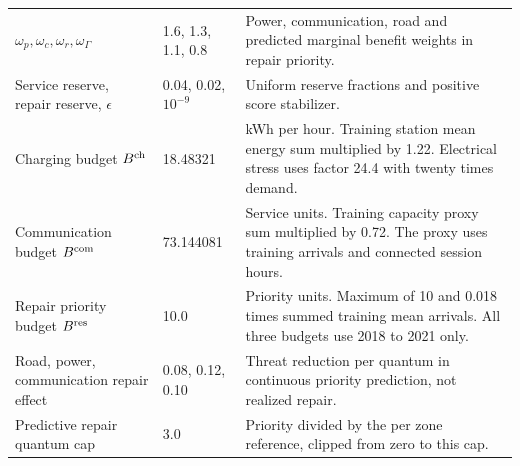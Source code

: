 \documentclass[journal]{IEEEtran}
\begin{document}
\begin{table}[p]
\begin{tabular}{@{}p{}p{}p{}@{}}
$\omega_p,\omega_c,\omega_r,\omega_\Gamma$ & 1.6, 1.3, 1.1, 0.8 & Power, communication, road and predicted marginal benefit weights in repair priority. \\
Service reserve, repair reserve, $\epsilon$ & 0.04, 0.02, $10^{-9}$ & Uniform reserve fractions and positive score stabilizer. \\
Charging budget $B^{\rm ch}$ & 18.48321 & kWh per hour. Training station mean energy sum multiplied by 1.22. Electrical stress uses factor 24.4 with twenty times demand. \\
Communication budget $B^{\rm com}$ & 73.144081 & Service units. Training capacity proxy sum multiplied by 0.72. The proxy uses training arrivals and connected session hours. \\
Repair priority budget $B^{\rm res}$ & 10.0 & Priority units. Maximum of 10 and 0.018 times summed training mean arrivals. All three budgets use 2018 to 2021 only. \\
Road, power, communication repair effect & 0.08, 0.12, 0.10 & Threat reduction per quantum in continuous priority prediction, not realized repair. \\
Predictive repair quantum cap & 3.0 & Priority divided by the per zone reference, clipped from zero to this cap. \\
\bottomrule\end{tabular}
\end{table}
\end{document}
